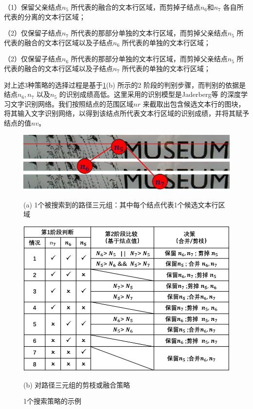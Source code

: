         （1）保留父亲结点$n_5$ 所代表的融合的文本行区域，而剪掉子结点$n_6$和$n_7$ 各自所代表的分离的文本行区域；

        （2）仅保留子结点$n_7$ 所代表的那部分单独的文本行区域，而剪掉父亲结点$n_5$ 所代表的融合的文本行区域以及子结点$n_6$ 所代表的单独的文本行区域；

        （2）仅保留子结点$n_6$ 所代表的那部分单独的文本行区域，而剪掉父亲结点$n_5$ 所代表的融合的文本行区域以及子结点$n_7$ 所代表的单独的文本行区域；

        对上述3种策略的选择过程是基于\ref{fig.c4_search_strategy}(b) 所示的2 阶段的判别步骤，而判别的依据是结点$n_6,n_7$ 以及$n_5$ 的识别成绩高低。这里采用的识别模型是Jaderberg等\cite{Jaderberg2016Reading} 的深度学习文字识别网络。我们按照结点的范围区域$nr$ 来截取出包含候选文本行的图块，将其输入文字识别网络，以得到该结点所代表文本行区域的识别成绩，并将其赋予结点的值$nv$。

        \begin{figure}[!h]
        \centering
        \includegraphics[width=\textwidth]{./figures/c4_search_strategy1.jpg}
        \centerline{\small (a) 1个被搜索到的路径三元组：其中每个结点代表1个候选文本行区域 }
        \includegraphics[width=\textwidth]{./figures/c4_search_strategy2.jpg}
        \centerline{\small (b) 对路径三元组的剪枝或融合策略}
        \caption{ 1个搜索策略的示例}
        \label{fig.c4_search_strategy}
        \end{figure}

